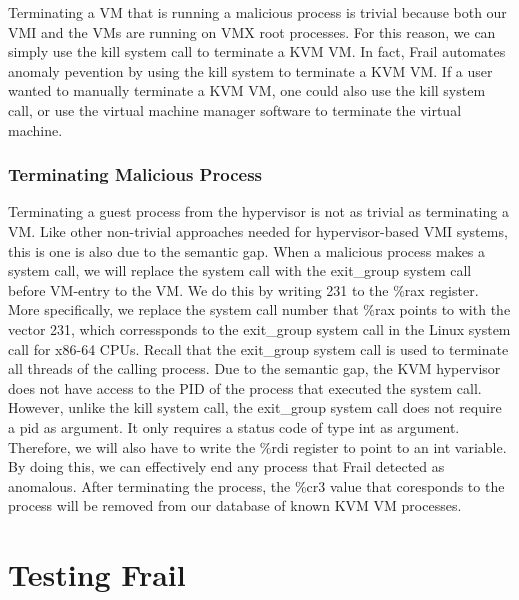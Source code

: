 \documentclass{report}
\begin{document}
\begin{spacing}{1.5}
{\large
Terminating a VM that is running a malicious process is trivial because both our VMI and the VMs are running on VMX root processes. For this reason, we can simply use the kill system call to terminate a KVM VM. In fact, Frail automates anomaly pevention by using the kill system to terminate a KVM VM. If a user wanted to manually terminate a KVM VM, one could also use the kill system call, or use the virtual machine manager software to terminate the virtual machine. 
\newline
}

\subsection{Terminating Malicious Process}


{\large
Terminating a guest process from the hypervisor is not as trivial as terminating a VM. Like other non-trivial approaches needed for hypervisor-based VMI systems, this is one is also due to the semantic gap. When a malicious process makes a system call, we will replace the system call with the exit\_group system call before VM-entry to the VM. We do this by writing 231 to the \%rax register. More specifically, we replace the system call number that \%rax points to with the vector 231, which corressponds to the exit\_group system call in the Linux system call for x86-64 CPUs. Recall that the exit\_group system call is used to terminate all threads of the calling process. Due to the semantic gap, the KVM hypervisor does not have access to the PID of the process that executed the system call. However, unlike the kill system call, the exit\_group system call does not require a pid as argument. It only requires a status code of type int as argument. Therefore, we will also have to write the \%rdi register to point to an int variable. By doing this, we can effectively end any process that Frail detected as anomalous. After terminating the process, the \%cr3 value that coresponds to the process will be removed from our database of known KVM VM processes.
\newline
}











\chapter{Testing Frail}


\end{spacing}
\end{document}
